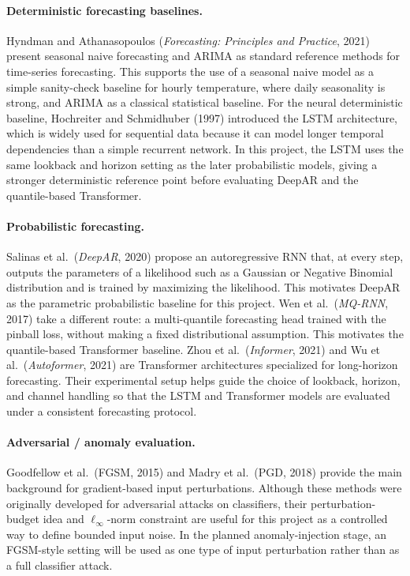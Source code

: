 \documentclass[11pt,a4paper]{article}
\begin{document}
\paragraph{Deterministic forecasting baselines.}
Hyndman and Athanasopoulos (\emph{Forecasting: Principles and Practice}, 2021)
present seasonal naive forecasting and ARIMA as standard reference methods for
time-series forecasting. This supports the use of a seasonal naive model as a
simple sanity-check baseline for hourly temperature, where daily seasonality is
strong, and ARIMA as a classical statistical baseline. For the neural
deterministic baseline, Hochreiter and Schmidhuber (1997) introduced the LSTM
architecture, which is widely used for sequential data because it can model
longer temporal dependencies than a simple recurrent network. In this project,
the LSTM uses the same lookback and horizon setting as the later probabilistic
models, giving a stronger deterministic reference point before evaluating
DeepAR and the quantile-based Transformer.

\paragraph{Probabilistic forecasting.}
Salinas et al.\ (\emph{DeepAR}, 2020) propose an autoregressive RNN that,
at every step, outputs the parameters of a likelihood such as a Gaussian or
Negative Binomial distribution and is trained by maximizing the likelihood.
This motivates DeepAR as the parametric probabilistic baseline for this
project. Wen et al.\ (\emph{MQ-RNN}, 2017) take a different route: a
multi-quantile forecasting head trained with the pinball loss, without making
a fixed distributional assumption. This motivates the quantile-based
Transformer baseline. Zhou et al.\ (\emph{Informer}, 2021) and Wu et al.\
(\emph{Autoformer}, 2021) are Transformer architectures specialized for
long-horizon forecasting. Their experimental setup helps guide the choice of
lookback, horizon, and channel handling so that the LSTM and Transformer
models are evaluated under a consistent forecasting protocol.

\paragraph{Adversarial / anomaly evaluation.}
Goodfellow et al.\ (FGSM, 2015) and Madry et al.\ (PGD, 2018) provide the
main background for gradient-based input perturbations. Although these methods
were originally developed for adversarial attacks on classifiers, their
perturbation-budget idea and $\ell_{\infty}$-norm constraint are useful for
this project as a controlled way to define bounded input noise. In the planned
anomaly-injection stage, an FGSM-style setting will be used as one type of
input perturbation rather than as a full classifier attack.
\end{document}
